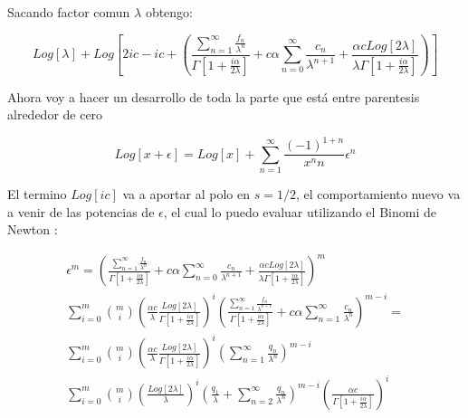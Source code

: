 Sacando factor comun $\lambda$ obtengo:

\begin{equation}
Log[\lambda] + 
Log \left[
	2 i  c
	- i c +
	\left(
		\frac{\sum _{n=1} ^{\infty} \frac{f _n}{\lambda ^n}}
			 {\Gamma[1+ \frac{i \alpha}{2 \lambda}]}		
		+ c \alpha \sum _{n=0} ^{\infty} \frac{c _n}{\lambda ^{n+1}} +
		\frac{\alpha c Log[2 \lambda]}{\lambda \Gamma [1 + \frac{i \alpha}{2 \lambda} ]}	
		\right)
		\right]		
\end{equation}


Ahora voy a hacer un desarrollo de toda la parte que está entre parentesis alrededor de cero


\begin{equation}
Log[x + \epsilon] =
Log[x] + 
\sum _{n=1} ^{\infty}
	\frac{(-1) ^{1+n} }
     	{x ^n n}
     \epsilon ^{n}
\end{equation}

El termino $Log[i c]$ va a aportar al polo en $s=1/2$, el comportamiento nuevo va a venir de las potencias de $\epsilon$, el cual lo puedo evaluar utilizando el Binomi de Newton :

\begin{equation}
\begin{array}{c}
\epsilon ^m =
	\left(
		\frac{\sum _{n=1} ^{\infty} \frac{f _n}{\lambda ^n}}
			 {\Gamma[1+ \frac{i \alpha}{2 \lambda}]}		
		+ c \alpha \sum _{n=0} ^{\infty} \frac{c _n}{\lambda ^{n+1}} +
		\frac{\alpha c Log[2 \lambda]}{\lambda \Gamma [1 + \frac{i \alpha}{2 \lambda} ]}	
		\right) ^m \\
\sum _{i=0} ^{m}
{m\choose i}
\left(
	\frac{\alpha c}{\lambda} \frac{Log [2 \lambda]}{\Gamma [1 + \frac{i \alpha}{2 \lambda}]}
	\right) ^{i}
\left(
	\frac{\sum _{n=1} ^{\infty} \frac{f _n}{\lambda ^{n+1}}}
		{\Gamma[1+ \frac{i \alpha}{2 \lambda}]}		
		+ c \alpha \sum _{n=1} ^{\infty} \frac{c _n}{\lambda ^n} 
	\right) ^{m-i } = \\
\sum _{i=0} ^{m}
{m\choose i}
\left(
	\frac{\alpha c}{\lambda} \frac{Log [2 \lambda]}{\Gamma [1+ \frac{i \alpha}{2 \lambda}]}
	\right) ^{i} 
\left(
	\sum _{n=1} ^{\infty} \frac{q_n}{\lambda ^n}
\right) ^{m-i} \\
\sum _{i=0} ^{m}
{m\choose i}
\left(
	\frac{Log [2 \lambda]}{ \lambda }
	\right) ^{i} 
\left(
	\frac{q_1}{\lambda} + \sum _{n=2} ^{\infty} \frac{q_n}{\lambda ^n}
\right) ^{m-i} 
\left(
	\frac{\alpha c}{\Gamma [1+ \frac{i \alpha}{2 \lambda}]}
	\right) ^i \\
\end{array}
\end{equation}

